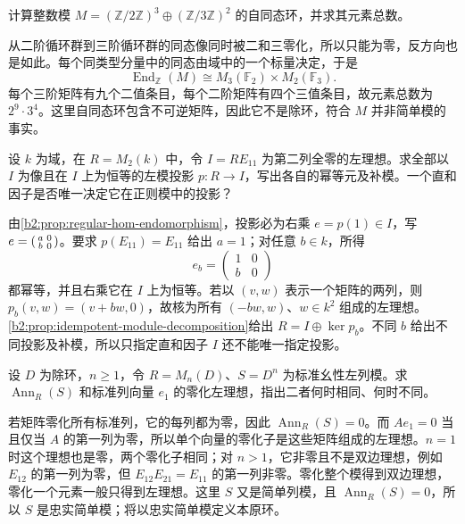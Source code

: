 \begin{exercise}\label{b2:ex:13-endomorphism-blocks}
	计算整数模 \(M=(\mathbb Z/2\mathbb Z)^3\oplus(\mathbb Z/3\mathbb Z)^2\) 的自同态环，并求其元素总数。
\end{exercise}
\begin{solution}
	从二阶循环群到三阶循环群的同态像同时被二和三零化，所以只能为零，反方向也是如此。每个同类型分量中的同态由域中的一个标量决定，于是
	\[
		\operatorname{End}_{\mathbb Z}(M)\cong M_3(\mathbb F_2)\times M_2(\mathbb F_3).
	\]
	每个三阶矩阵有九个二值条目，每个二阶矩阵有四个三值条目，故元素总数为 \(2^9\cdot3^4\)。这里自同态环包含不可逆矩阵，因此它不是除环，符合 \(M\) 并非简单模的事实。
\end{solution}

\begin{exercise}\label{b2:ex:13-idempotent-summands}
	设 \(k\) 为域，在 \(R=M_2(k)\) 中，令 \(I=RE_{11}\) 为第二列全零的左理想。求全部以 \(I\) 为像且在 \(I\) 上为恒等的左模投影 \(p:R\to I\)，写出各自的幂等元及补模。一个直和因子是否唯一决定它在正则模中的投影？
\end{exercise}
\begin{solution}
	由\cref{b2:prop:regular-hom-endomorphism}，投影必为右乘 \(e=p(1)\in I\)，写 \(e=\begin{psmallmatrix}a&0\\b&0\end{psmallmatrix}\)。要求 \(p(E_{11})=E_{11}\) 给出 \(a=1\)；对任意 \(b\in k\)，所得
	\[
		e_b=\begin{pmatrix}1&0\\b&0\end{pmatrix}
	\]
	都幂等，并且右乘它在 \(I\) 上为恒等。若以 \((v,w)\) 表示一个矩阵的两列，则 \(p_b(v,w)=(v+bw,0)\)，故核为所有 \((-bw,w)\)、\(w\in k^2\) 组成的左理想。\cref{b2:prop:idempotent-module-decomposition}给出 \(R=I\oplus\ker p_b\)。不同 \(b\) 给出不同投影及补模，所以只指定直和因子 \(I\) 还不能唯一指定投影。
\end{solution}

\begin{exercise}\label{b2:ex:13-annihilator-vector-module}
	设 \(D\) 为除环，\(n\ge1\)，令 \(R=M_n(D)\)、\(S=D^n\) 为标准幺性左列模。求 \(\operatorname{Ann}_R(S)\) 和标准列向量 \(e_1\) 的零化左理想，指出二者何时相同、何时不同。
\end{exercise}
\begin{solution}
	若矩阵零化所有标准列，它的每列都为零，因此 \(\operatorname{Ann}_R(S)=0\)。而 \(Ae_1=0\) 当且仅当 \(A\) 的第一列为零，所以单个向量的零化子是这些矩阵组成的左理想。\(n=1\) 时这个理想也是零，两个零化子相同；对 \(n>1\)，它非零且不是双边理想，例如 \(E_{12}\) 的第一列为零，但 \(E_{12}E_{21}=E_{11}\) 的第一列非零。零化整个模得到双边理想，零化一个元素一般只得到左理想。这里 \(S\) 又是简单列模，且 \(\operatorname{Ann}_R(S)=0\)，所以 \(S\) 是忠实简单模；将以忠实简单模定义本原环。
\end{solution}

